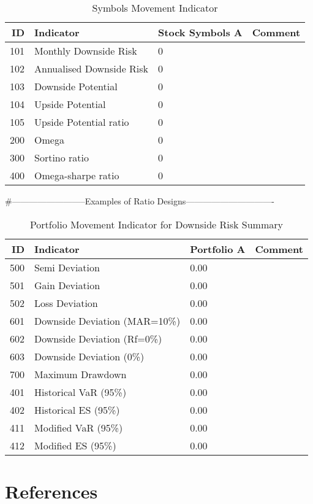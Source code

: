 \begin{table}[ht]
	\caption{Symbols Movement Indicator \cite{key100}}
	\begin{tabular}{rlll}
		\hline
		ID & Indicator & Stock Symbols A & Comment \\
		\hline
		101 & Monthly Downside Risk & 0 & \\ 
		102 & Annualised Downside Risk & 0 & \\ 
		103 & Downside Potential & 0 & \\ 
		104 & Upside Potential & 0 & \\ 
		105 & Upside Potential ratio & 0 & \\ 
		200 & Omega & 0 &  \\ 
		300 & Sortino ratio & 0 & \\ 
		400 & Omega-sharpe ratio & 0 & \\ 
		\hline
	\end{tabular}
\end{table}
#--------------------------Examples of Ratio Designs-------------------------------
\begin{table}[ht]
	\caption{Portfolio Movement Indicator for Downside Risk Summary \cite{key400}}
	\begin{tabular}{r|p{4cm}|ll}
		\hline
		ID & Indicator & Portfolio A & Comment \\
		\hline
		500 & Semi Deviation & 0.00 & \\ 
		501 & Gain Deviation & 0.00 & \\ 
		502 & Loss Deviation & 0.00 &  \\ 
		\hline
		601 & Downside Deviation (MAR=10\%) & 0.00 & \\ 
		602 & Downside Deviation (Rf=0\%) & 0.00 & \\ 
		603 & Downside Deviation (0\%) & 0.00 & \\ 
		\hline
		700 & Maximum Drawdown & 0.00 & \\ 
		\hline
		401 & Historical VaR (95\%) & 0.00 & \\ 
		402 & Historical ES (95\%) &  0.00 &  \\ 
		\hline
		411 & Modified VaR (95\%) &  0.00 & \\ 
		412 & Modified ES (95\%) &  0.00 &  \\ 
		\hline
	\end{tabular}
\end{table}


\section{References}

